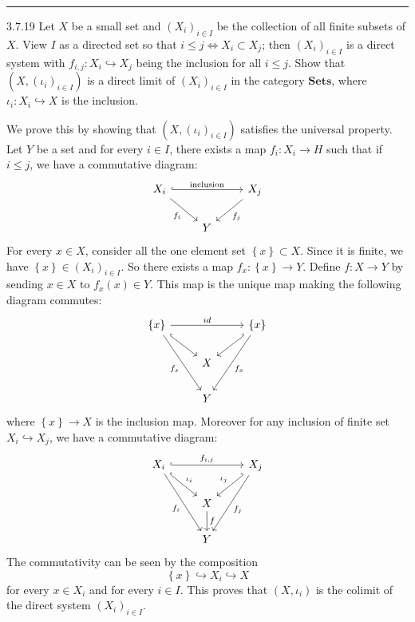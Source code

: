 \documentclass[a4paper, 12pt]{article}
\begin{document}
\noindent\rule{7in}{2.8pt}
\begin{problem}{3.7.19}
Let \(X\) be a small set and \((X_i)_{i\in I}\)	be the collection of all finite subsets of \(X\). View \(I\) as a directed set so that \(i\leq j\Leftrightarrow X_i\subset X_j\); then 
\((X_i)_{i\in I}\) is a direct system with \(f_{i,j}:X_i\hookrightarrow X_j\) being the inclusion for all \(i\leq j\). Show that \((X,(\iota_i)_{i\in I})\) is a direct limit of \((X_i)_{i\in I}\) 
in the category \(\mathbf{Sets}\), where \(\iota_i:X_i\hookrightarrow X\) is the inclusion.
\end{problem}
\begin{solution}
We prove this by showing that \((X,(\iota_i)_{i\in I})\) satisfies the universal property. Let \(Y\) be a set and for every \(i\in I\), there exists a map \(f_i:X_i\rightarrow H\) such that if \(i\leq j\), we have a commutative diagram: 
\[\begin{tikzcd}
	{X_i} && {X_j} \\
	& Y
	\arrow["{\text{inclusion}}", hook, from=1-1, to=1-3]
	\arrow["{f_i}"', from=1-1, to=2-2]
	\arrow["{f_j}", from=1-3, to=2-2]
\end{tikzcd}\]
For every \(x\in X\), consider all the one element set \(\left\{ x \right\}\subset X\). Since it is finite, we have \(\left\{ x \right\}\in (X_i)_{i\in I}\). So there exists a map \(f_x:\left\{ x \right\}\rightarrow Y\). Define \(f:X\rightarrow Y\) by sending 
\(x\in X\) to \(f_x(x)\in Y\). This map is the unique map making the following diagram commutes:
\[\begin{tikzcd}
	{\left\{x\right\}} && {\left\{x\right\}} \\
	& X \\
	& Y
	\arrow["id", from=1-1, to=1-3]
	\arrow[hook, from=1-1, to=2-2]
	\arrow["{f_x}"', from=1-1, to=3-2]
	\arrow[hook', from=1-3, to=2-2]
	\arrow["{f_x}", from=1-3, to=3-2]
\end{tikzcd}\]
where \(\left\{ x \right\}\rightarrow X\) is the inclusion map. Moreover for any inclusion of finite set \(X_i\hookrightarrow X_j\), we have a commutative diagram:
\[\begin{tikzcd}
	{X_i} && {X_j} \\
	& X \\
	& Y
	\arrow["{f_{i,j}}", hook, from=1-1, to=1-3]
	\arrow["{\iota_i}", hook, from=1-1, to=2-2]
	\arrow["{f_i}"', from=1-1, to=3-2]
	\arrow["{\iota_j}"', hook', from=1-3, to=2-2]
	\arrow["{f_j}", from=1-3, to=3-2]
	\arrow["f", from=2-2, to=3-2]
\end{tikzcd}\]
The commutativity can be seen by the composition 
\[\left\{ x \right\}\hookrightarrow X_i\hookrightarrow X\]
for every \(x\in X_i\) and for every \(i\in I\). This proves that \((X,\iota_i)\) is the colimit of the direct system \((X_i)_{i\in I}\).	
\end{solution}
\end{document}
